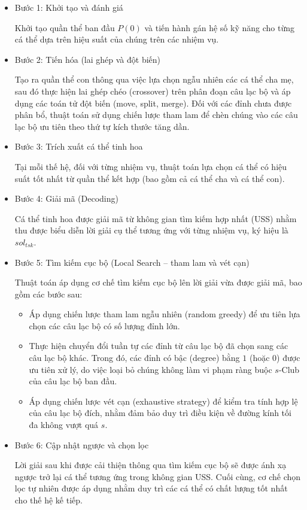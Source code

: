 \begin{itemize}
    \item {Bước 1: Khởi tạo và đánh giá}
    
    Khởi tạo quần thể ban đầu $P(0)$ và tiến hành gán hệ số kỹ năng cho từng cá thể dựa trên hiệu suất của chúng trên các nhiệm vụ.
    
    \item {Bước 2: Tiến hóa (lai ghép và đột biến)}
    
    Tạo ra quần thể con thông qua việc lựa chọn ngẫu nhiên các cá thể cha mẹ, sau đó thực hiện lai ghép chéo (crossover) trên phân đoạn câu lạc bộ và áp dụng các toán tử đột biến (move, split, merge). Đối với các đỉnh chưa được phân bổ, thuật toán sử dụng chiến lược tham lam để chèn chúng vào các câu lạc bộ ưu tiên theo thứ tự kích thước tăng dần.
    
    \item {Bước 3: Trích xuất cá thể tinh hoa}
    
    Tại mỗi thế hệ, đối với từng nhiệm vụ, thuật toán lựa chọn cá thể có hiệu suất tốt nhất từ quần thể kết hợp (bao gồm cả cá thể cha và cá thể con).
    
    \item {Bước 4: Giải mã (Decoding)}
    
    Cá thể tinh hoa được giải mã từ không gian tìm kiếm hợp nhất (USS) nhằm thu được biểu diễn lời giải cụ thể tương ứng với từng nhiệm vụ, ký hiệu là $sol_{tsk}$.
    
    \item {Bước 5: Tìm kiếm cục bộ (Local Search -- tham lam và vét cạn)}
    
    Thuật toán áp dụng cơ chế tìm kiếm cục bộ lên lời giải vừa được giải mã, bao gồm các bước sau:
    \begin{itemize}
        \item Áp dụng chiến lược tham lam ngẫu nhiên (random greedy) để ưu tiên lựa chọn các câu lạc bộ có số lượng đỉnh lớn.
        
        \item Thực hiện chuyển đổi tuần tự các đỉnh từ câu lạc bộ đã chọn sang các câu lạc bộ khác. Trong đó, các đỉnh có bậc (degree) bằng $1$ (hoặc $0$) được ưu tiên xử lý, do việc loại bỏ chúng không làm vi phạm ràng buộc $s$-Club của câu lạc bộ ban đầu.
        
        \item Áp dụng chiến lược vét cạn (exhaustive strategy) để kiểm tra tính hợp lệ của câu lạc bộ đích, nhằm đảm bảo duy trì điều kiện về đường kính tối đa không vượt quá $s$.
    \end{itemize}
    
    \item {Bước 6: Cập nhật ngược và chọn lọc}
    
    Lời giải sau khi được cải thiện thông qua tìm kiếm cục bộ sẽ được ánh xạ ngược trở lại cá thể tương ứng trong không gian USS. Cuối cùng, cơ chế chọn lọc tự nhiên được áp dụng nhằm duy trì các cá thể có chất lượng tốt nhất cho thế hệ kế tiếp.
\end{itemize}



